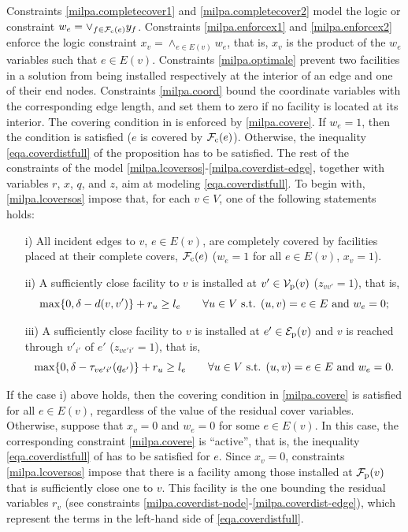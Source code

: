 Constraints \eqref{milpa.completecover1} and \eqref{milpa.completecover2} model the logic or constraint $w_e = \lor_{f \in \mathcal F_{\mathrm{c}}(e)} y_f$.  Constraints \eqref{milpa.enforcex1} and \eqref{milpa.enforcex2} enforce the logic constraint  $x_v = \land_{e \in E(v)} w_e$, that is, $x_v$ is the product of the $w_e$ variables such that $e\in E(v)$.  
Constraints \eqref{milpa.optimale} prevent two facilities in a solution from being installed respectively at the interior of an edge and one of their end nodes.
Constraints \eqref{milpa.coord} bound the coordinate variables with the corresponding edge length, and set them to zero if no facility is located at its interior.
The covering condition in  is enforced by \eqref{milpa.covere}. If $w_e=1$, then the condition is satisfied ($e$ is covered by $\mathcal F_{\mathrm{c}}(e)$). Otherwise, the inequality \eqref{eqa.coverdistfull} of the proposition has to be satisfied. The rest of the constraints of the model \eqref{milpa.lcoversos}-\eqref{milpa.coverdist-edge}, together with variables $r$, $x$, $q$, and $z$, aim at modeling \eqref{eqa.coverdistfull}. To begin with, \eqref{milpa.lcoversos} impose that, for each $v\in V$,  one of the following statements holds:
\begin{enumerate}
\item[i)] All incident edges to $v$, $e\in E(v)$, are completely covered by facilities placed at their complete covers, $\mathcal F_{\mathrm{c}}(e)$  ($w_e=1$ for all $e\in E(v)$, $x_{v}=1$).
\item[ii)] A sufficiently close facility to $v$ is installed at $v'\in \mathcal V_{\mathrm{p}}(v)$ ($z_{vv'}=1$), that is, $$\max\{0,\delta-d(v,v')\}+r_u\geq l_e \qquad \forall u\in V \textup{ s.t. } (u,v)=e\in E \textup{ and }w_e=0;$$
\item[iii)]  A sufficiently close facility to $v$ is installed at $e'\in{\mathcal E}_{\mathrm{p}}(v)$ and $v$ is reached through $v'_{i'}$ of $e'$ ($z_{ve'i'}=1$), that is, $$\max\{0,\delta-\tau_{ve'i'}(q_{e'})\}+r_u\geq l_e \qquad \forall u\in V \textup{ s.t. } (u,v)=e\in E \textup{ and }w_e=0.$$
\end{enumerate}
If the case i) above holds, then the covering condition in \eqref{milpa.covere} is satisfied for all $e\in E(v)$, regardless of the value of the residual cover variables. Otherwise, suppose that $x_v=0$ and $w_e=0$ for some $e\in E(v)$. In this case, the corresponding constraint \eqref{milpa.covere} is ``active'', that is,  the inequality \eqref{eqa.coverdistfull} of  has to be satisfied for $e$. Since $x_v=0$, constraints \eqref{milpa.lcoversos} impose that there is a facility among those installed at $\mathcal F_{\mathrm{p}}(v)$ that is sufficiently close one to $v$. This facility is the one bounding the residual variables $r_v$ (see constraints \eqref{milpa.coverdist-node}-\eqref{milpa.coverdist-edge}), which represent the terms in the left-hand side of \eqref{eqa.coverdistfull}.

